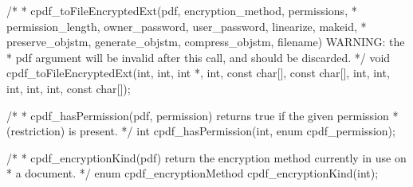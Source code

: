 /*
 * cpdf_toFileEncryptedExt(pdf, encryption_method, permissions,
 * permission_length, owner_password, user_password, linearize, makeid,
 * preserve_objstm, generate_objstm, compress_objstm, filename) WARNING: the
 * pdf argument will be invalid after this call, and should be discarded.
 */
void cpdf_toFileEncryptedExt(int, int, int *, int, const char[], const char[],
                             int, int, int, int, int, const char[]);

/*
 * cpdf_hasPermission(pdf, permission) returns true if the given permission
 * (restriction) is present.
 */
int cpdf_hasPermission(int, enum cpdf_permission);

/*
 * cpdf_encryptionKind(pdf) return the encryption method currently in use on
 * a document.
 */
enum cpdf_encryptionMethod cpdf_encryptionKind(int);

